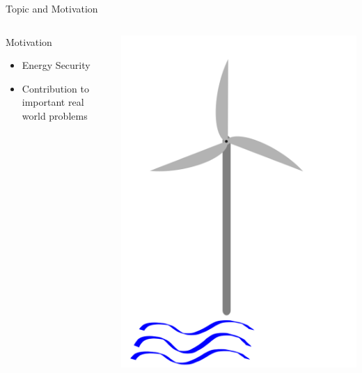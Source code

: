\documentclass[usenames,dvipsnames,aspectratio=169]{beamer}
\begin{document}
\begin{frame}{Topic and Motivation}
\begin{columns}[T]
\begin{column}{.68\textwidth}
\begin{itemize}
	\end{itemize}
	\vspace{0.5cm}
	Motivation
	\begin{itemize}
		\item Energy Security
		\item Contribution to important real world problems
	\end{itemize}
\end{column}%
\hfill
\begin{column}{.28\textwidth}
\includegraphics[scale=0.2]{images/icon_offshore_wind_turbine.png}
\end{column}%
\end{columns}
\end{frame}
\end{document}
